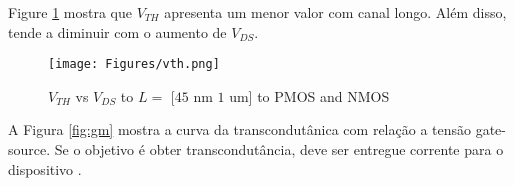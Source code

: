 \documentclass[10pt, conference,a4paper]{IEEEtran}
\begin{document}







Figure \ref{fig:vth} mostra que $V_{TH}$ apresenta um menor valor com canal longo. Além disso, tende a diminuir com o aumento de $V_{DS}$.

\begin{figure}[h]
    \centering
    \texttt{[image: Figures/vth.png]}
    \caption{$V_{TH}$ vs $V_{DS}$ to $L =$ [$45$ nm $1$ um] to PMOS and NMOS}
    \label{fig:vth}
\end{figure}



A Figura \ref{fig:gm} mostra a curva da transcondutânica com relação a tensão gate-source. Se o objetivo é obter transcondutância, deve ser entregue corrente para o dispositivo \cite{youtube_gm/Id}. 
\end{document}
